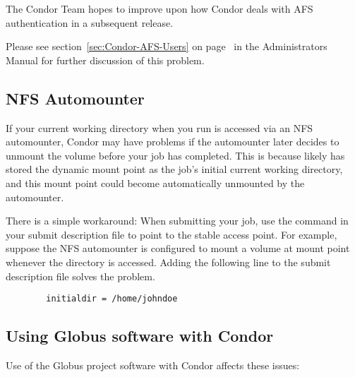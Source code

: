 The Condor Team hopes to improve upon how Condor deals with AFS 
authentication in a subsequent release.

Please see section~\ref{sec:Condor-AFS-Users} on
page~\pageref{sec:Condor-AFS-Users} in the Administrators Manual for
further discussion of this problem.

\subsection{NFS Automounter}

If your current working directory when you run 
is accessed via an NFS automounter, Condor may have problems if the
automounter later decides to unmount the volume before your job has
completed.
This is because  likely has stored the
dynamic mount point as the job's initial current working directory, and
this mount point could become automatically unmounted by the
automounter.

There is a simple workaround: When submitting your job, use the 
 command in your submit description file to point to
the stable access point.
For example,
suppose the NFS automounter is configured to mount a volume at mount point
whenever the directory  is accessed.
Adding the following line to the
submit description file solves the problem.
\begin{verbatim}
        initialdir = /home/johndoe
\end{verbatim}

\subsection{Using Globus software with Condor}
Use of the Globus project software  with
Condor affects these issues:

